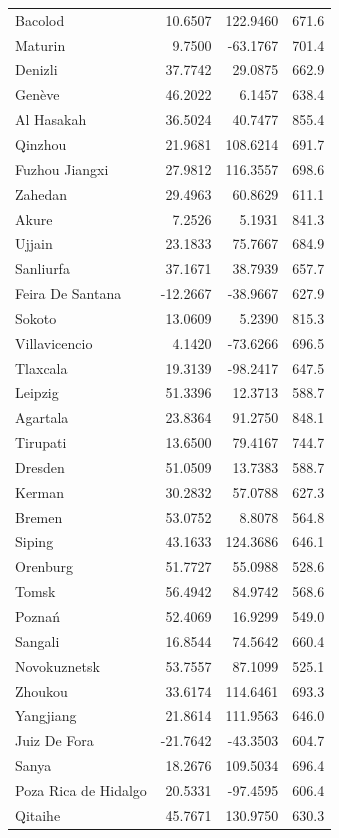 \begin{longtable}{lrrc}
Bacolod & 10.6507 & 122.9460 & 671.6 \\
Maturin & 9.7500 & -63.1767 & 701.4 \\
Denizli & 37.7742 & 29.0875 & 662.9 \\
Genève & 46.2022 & 6.1457 & 638.4 \\
Al Hasakah & 36.5024 & 40.7477 & 855.4 \\
Qinzhou & 21.9681 & 108.6214 & 691.7 \\
Fuzhou  Jiangxi & 27.9812 & 116.3557 & 698.6 \\
Zahedan & 29.4963 & 60.8629 & 611.1 \\
Akure & 7.2526 & 5.1931 & 841.3 \\
Ujjain & 23.1833 & 75.7667 & 684.9 \\
Sanliurfa & 37.1671 & 38.7939 & 657.7 \\
Feira De Santana & -12.2667 & -38.9667 & 627.9 \\
Sokoto & 13.0609 & 5.2390 & 815.3 \\
Villavicencio & 4.1420 & -73.6266 & 696.5 \\
Tlaxcala & 19.3139 & -98.2417 & 647.5 \\
Leipzig & 51.3396 & 12.3713 & 588.7 \\
Agartala & 23.8364 & 91.2750 & 848.1 \\
Tirupati & 13.6500 & 79.4167 & 744.7 \\
Dresden & 51.0509 & 13.7383 & 588.7 \\
Kerman & 30.2832 & 57.0788 & 627.3 \\
Bremen & 53.0752 & 8.8078 & 564.8 \\
Siping & 43.1633 & 124.3686 & 646.1 \\
Orenburg & 51.7727 & 55.0988 & 528.6 \\
Tomsk & 56.4942 & 84.9742 & 568.6 \\
Poznań & 52.4069 & 16.9299 & 549.0 \\
Sangali & 16.8544 & 74.5642 & 660.4 \\
Novokuznetsk & 53.7557 & 87.1099 & 525.1 \\
Zhoukou & 33.6174 & 114.6461 & 693.3 \\
Yangjiang & 21.8614 & 111.9563 & 646.0 \\
Juiz De Fora & -21.7642 & -43.3503 & 604.7 \\
Sanya & 18.2676 & 109.5034 & 696.4 \\
Poza Rica de Hidalgo & 20.5331 & -97.4595 & 606.4 \\
Qitaihe & 45.7671 & 130.9750 & 630.3 \\

\end{longtable}

